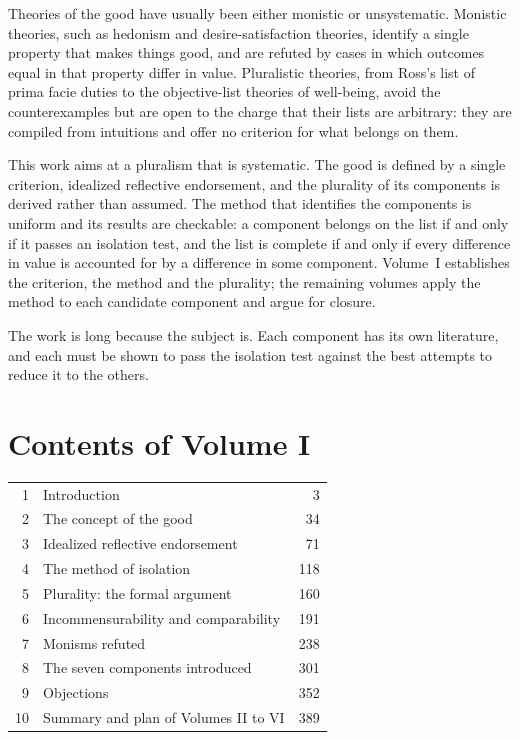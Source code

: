 \documentclass{situationist-preprint}
\begin{document}
Theories of the good have usually been either monistic or unsystematic. Monistic theories, such as hedonism and desire-satisfaction theories, identify a single property that makes things good, and are refuted by cases in which outcomes equal in that property differ in value. Pluralistic theories, from Ross's list of prima facie duties to the objective-list theories of well-being, avoid the counterexamples but are open to the charge that their lists are arbitrary: they are compiled from intuitions and offer no criterion for what belongs on them.

This work aims at a pluralism that is systematic. The good is defined by a single criterion, idealized reflective endorsement, and the plurality of its components is derived rather than assumed. The method that identifies the components is uniform and its results are checkable: a component belongs on the list if and only if it passes an isolation test, and the list is complete if and only if every difference in value is accounted for by a difference in some component. Volume~I establishes the criterion, the method and the plurality; the remaining volumes apply the method to each candidate component and argue for closure.

The work is long because the subject is. Each component has its own literature, and each must be shown to pass the isolation test against the best attempts to reduce it to the others.

\section*{Contents of Volume I}

\begin{center}\small
\begin{tabular}{@{}rlr@{}}
1 & Introduction & 3 \\
2 & The concept of the good & 34 \\
3 & Idealized reflective endorsement & 71 \\
4 & The method of isolation & 118 \\
5 & Plurality: the formal argument & 160 \\
6 & Incommensurability and comparability & 191 \\
7 & Monisms refuted & 238 \\
8 & The seven components introduced & 301 \\
9 & Objections & 352 \\
10 & Summary and plan of Volumes II to VI & 389 \\
\end{tabular}
\end{center}
\end{document}
